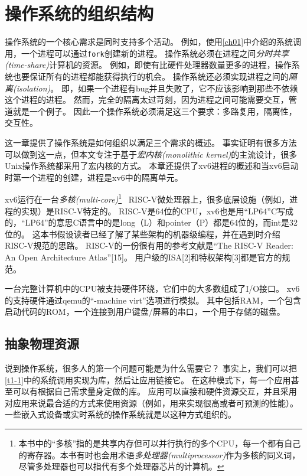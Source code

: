 \chapter{操作系统的组织结构}\label{ch02}

操作系统的一个核心需求是同时支持多个活动。
例如，使用\autoref{ch01}中介绍的系统调用，一个进程可以通过\texttt{fork}创建新的进程。
操作系统必须在进程之间\emph{分时共享(time-share)}计算机的资源。
例如，即使有比硬件处理器数量更多的进程，操作系统也要保证所有的进程都能获得执行的机会。
操作系统还必须实现进程之间的\emph{隔离(isolation)}。
即，如果一个进程有bug并且失败了，它不应该影响到那些不依赖这个进程的进程。
然而，完全的隔离太过苛刻，因为进程之间可能需要交互，管道就是一个例子。
因此一个操作系统必须满足这三个要求：多路复用，隔离性，交互性。

这一章提供了操作系统是如何组织以满足三个需求的概述。
事实证明有很多方法可以做到这一点，但本文专注于基于\emph{宏内核(monolithic kernel)}的主流设计，很多Unix操作系统都采用了宏内核的方式。
本章还提供了xv6进程的概述和当xv6启动时第一个进程的创建，进程是xv6中的隔离单元。

xv6运行在一台\emph{多核(multi-core)}\footnote{本书中的“多核”指的是共享内存但可以并行执行的多个CPU，每一个都有自己的寄存器。本书有时也会用术语\emph{多处理器(multiprocessor)}作为多核的同义词，尽管多处理器也可以指代有多个处理器芯片的计算机。}  RISC-V微处理器上，很多底层设施（例如，进程的实现）是RISC-V特定的。
RISC-V是64位的CPU，xv6也是用“LP64”C写成的，“LP64”的意思C语言中的是long（L）和pointer（P）都是64位的，而int是32位的。
这本书假设读者已经了解了某些架构的机器级编程，并在遇到时介绍RISC-V规范的思路。
RISC-V的一份很有用的参考文献是“The RISC-V Reader: An Open Architecture Atlas”[15]。
用户级的ISA[2]和特权架构[3]都是官方的规范。

一台完整计算机中的CPU被支持硬件环绕，它们中的大多数组成了I/O接口。
xv6的支持硬件通过qemu的“-machine virt”选项进行模拟。
其中包括RAM，一个包含启动代码的ROM，一个连接到用户键盘/屏幕的串口，一个用于存储的磁盘。

\section{抽象物理资源}
说到操作系统，很多人的第一个问题可能是为什么需要它？
事实上，我们可以把\autoref{t1-1}中的系统调用实现为库，然后让应用链接它。
在这种模式下，每一个应用甚至可以有根据自己需求量身定做的库。
应用可以直接和硬件资源交互，并且采用对应用来说最合适的方式来使用资源（例如，用来实现很高或者可预测的性能）。
一些嵌入式设备或实时系统的操作系统就是以这种方式组织的。

